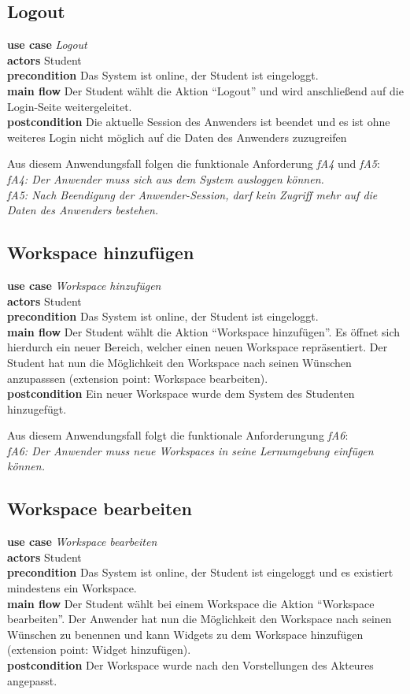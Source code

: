  \subsection{Logout}
\textbf{use case} \emph{Logout}\\
\textbf{actors} Student\\
\textbf{precondition} Das System ist online, der Student ist eingeloggt.\\
\textbf{main flow} Der Student wählt die Aktion "`Logout"' und wird anschließend auf die Login-Seite weitergeleitet.\\
\textbf{postcondition} Die aktuelle Session des Anwenders ist beendet und es ist ohne weiteres Login nicht möglich auf die Daten des Anwenders zuzugreifen 
 
Aus diesem Anwendungsfall folgen die funktionale Anforderung \emph{fA4} und \emph{fA5}:\\
\emph{fA4: Der Anwender muss sich aus dem System ausloggen können.}\\
\emph{fA5: Nach Beendigung der Anwender-Session, darf kein Zugriff mehr auf die Daten des Anwenders bestehen.}
 
\subsection{Workspace hinzufügen}
\textbf{use case} \emph{Workspace hinzufügen}\\
\textbf{actors} Student\\
\textbf{precondition} Das System ist online, der Student ist eingeloggt.\\
\textbf{main flow} Der Student wählt die Aktion "`Workspace hinzufügen"'. Es öffnet sich hierdurch ein neuer Bereich, welcher einen neuen Workspace repräsentiert. Der Student hat nun die Möglichkeit den Workspace nach seinen Wünschen anzupasssen (extension point: Workspace bearbeiten).\\
\textbf{postcondition} Ein neuer Workspace wurde dem System des Studenten hinzugefügt.
 
Aus diesem Anwendungsfall folgt die funktionale Anforderungung \emph{fA6}:\\
\emph{fA6: Der Anwender muss neue Workspaces in seine Lernumgebung einfügen können.}\\
 
\subsection{Workspace bearbeiten}
\textbf{use case} \emph{Workspace bearbeiten}\\
\textbf{actors} Student\\
\textbf{precondition} Das System ist online, der Student ist eingeloggt und es existiert mindestens ein Workspace.\\
\textbf{main flow} Der Student wählt bei einem Workspace die Aktion "`Workspace bearbeiten"'. Der Anwender hat nun die Möglichkeit den Workspace nach seinen Wünschen zu benennen und kann Widgets zu dem Workspace hinzufügen (extension point: Widget hinzufügen).\\
\textbf{postcondition} Der Workspace wurde nach den Vorstellungen des Akteures angepasst.
 
